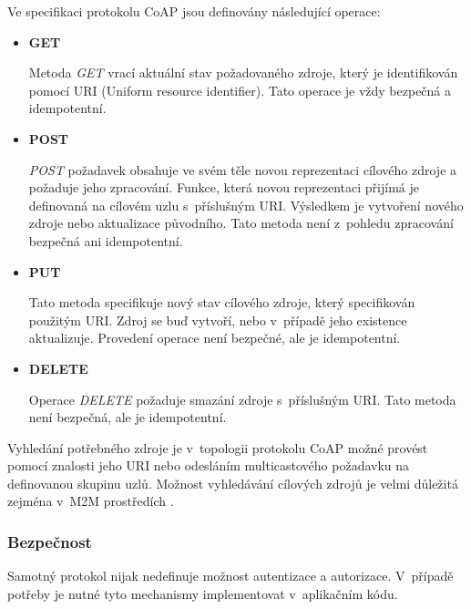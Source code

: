    Ve specifikaci protokolu CoAP jsou definovány následující operace:
   \begin{itemize}
    \item \textbf{GET}
    
    Metoda \textit{GET} vrací aktuální stav požadovaného zdroje, který je identifikován pomocí
    URI (Uniform resource identifier). Tato operace je vždy bezpečná a idempotentní.
    
    \item \textbf{POST}
    
    \textit{POST} požadavek obsahuje ve svém těle novou reprezentaci cílového zdroje a požaduje 
    jeho zpracování. Funkce, která
    novou reprezentaci přijímá je definovaná na cílovém uzlu s~příslušným URI.
    Výsledkem je vytvoření nového zdroje nebo aktualizace původního. Tato metoda
    není z~pohledu zpracování bezpečná ani idempotentní.
    
    \item \textbf{PUT}
    
    Tato metoda specifikuje nový stav cílového zdroje, který specifikován použitým URI. Zdroj
    se buď vytvoří, nebo 
    v~případě jeho existence aktualizuje. Provedení operace není bezpečné, ale 
    je idempotentní.
    
    \item \textbf{DELETE}
    
    Operace \textit{DELETE} požaduje smazání zdroje s~příslušným URI. Tato metoda není bezpečná,
    ale je idempotentní.
    
   \end{itemize}
   
   Vyhledání potřebného zdroje je v~topologii protokolu CoAP možné provést pomocí
   znalosti jeho URI nebo odesláním multicastového požadavku na definovanou
   skupinu uzlů. Možnost vyhledávání cílových zdrojů je velmi důležitá zejména
   v~M2M prostředích \cite{coap}.
   
   \subsubsection{Bezpečnost}
   Samotný protokol nijak nedefinuje možnost autentizace a autorizace. V~případě
   potřeby je nutné tyto mechanismy implementovat v~aplikačním kódu. 
   
